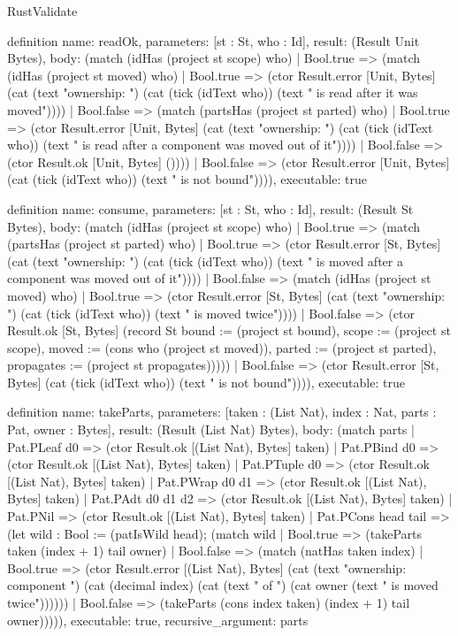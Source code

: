 \begin{lexlean}{RustValidate}
\begin{semanticmodule}
definition{
  name: readOk,
  parameters: [st : St, who : Id],
  result: (Result Unit Bytes),
  body: (match (idHas (project st scope) who)
    | Bool.true => (match (idHas (project st moved) who)
      | Bool.true => (ctor Result.error [Unit, Bytes] (cat (text "ownership: ") (cat (tick (idText who)) (text " is read after it was moved"))))
      | Bool.false => (match (partsHas (project st parted) who)
        | Bool.true => (ctor Result.error [Unit, Bytes] (cat (text "ownership: ") (cat (tick (idText who)) (text " is read after a component was moved out of it"))))
        | Bool.false => (ctor Result.ok [Unit, Bytes] ())))
    | Bool.false => (ctor Result.error [Unit, Bytes] (cat (tick (idText who)) (text " is not bound")))),
  executable: true
}

definition{
  name: consume,
  parameters: [st : St, who : Id],
  result: (Result St Bytes),
  body: (match (idHas (project st scope) who)
    | Bool.true => (match (partsHas (project st parted) who)
      | Bool.true => (ctor Result.error [St, Bytes] (cat (text "ownership: ") (cat (tick (idText who)) (text " is moved after a component was moved out of it"))))
      | Bool.false => (match (idHas (project st moved) who)
        | Bool.true => (ctor Result.error [St, Bytes] (cat (text "ownership: ") (cat (tick (idText who)) (text " is moved twice"))))
        | Bool.false => (ctor Result.ok [St, Bytes] (record St {bound := (project st bound), scope := (project st scope), moved := (cons who (project st moved)), parted := (project st parted), propagates := (project st propagates)}))))
    | Bool.false => (ctor Result.error [St, Bytes] (cat (tick (idText who)) (text " is not bound")))),
  executable: true
}

definition{
  name: takeParts,
  parameters: [taken : (List Nat), index : Nat, parts : Pat, owner : Bytes],
  result: (Result (List Nat) Bytes),
  body: (match parts
    | Pat.PLeaf d0 => (ctor Result.ok [(List Nat), Bytes] taken)
    | Pat.PBind d0 => (ctor Result.ok [(List Nat), Bytes] taken)
    | Pat.PTuple d0 => (ctor Result.ok [(List Nat), Bytes] taken)
    | Pat.PWrap d0 d1 => (ctor Result.ok [(List Nat), Bytes] taken)
    | Pat.PAdt d0 d1 d2 => (ctor Result.ok [(List Nat), Bytes] taken)
    | Pat.PNil => (ctor Result.ok [(List Nat), Bytes] taken)
    | Pat.PCons head tail => (let wild : Bool := (patIsWild head); (match wild
      | Bool.true => (takeParts taken (index + 1) tail owner)
      | Bool.false => (match (natHas taken index)
        | Bool.true => (ctor Result.error [(List Nat), Bytes] (cat (text "ownership: component ") (cat (decimal index) (cat (text " of ") (cat owner (text " is moved twice"))))))
        | Bool.false => (takeParts (cons index taken) (index + 1) tail owner))))),
  executable: true,
  recursive_argument: parts
}


\end{semanticmodule}
\end{lexlean}
